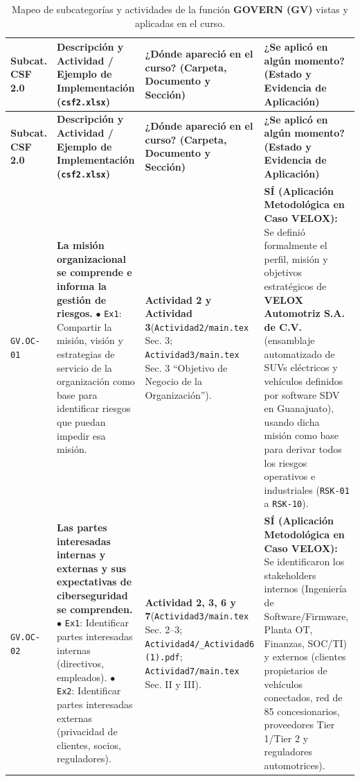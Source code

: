 \documentclass[letterpaper,11pt]{article}
\begin{document}
\begingroup
\scriptsize
\setlength{\tabcolsep}{3.5pt}
\renewcommand{\arraystretch}{1.24}
\begin{longtable}{|C{1.5cm}|L{5.3cm}|L{4.3cm}|L{5.8cm}|}
\caption{Mapeo de subcategorías y actividades de la función \textbf{GOVERN (GV)} vistas y aplicadas en el curso.}
\label{tab:mapeo-gv} \\
\hline
{}
\textbf{Subcat. CSF 2.0} & \textbf{Descripción y Actividad / Ejemplo de Implementación (\texttt{csf2.xlsx})} & \textbf{¿Dónde apareció en el curso? (Carpeta, Documento y Sección)} & \textbf{¿Se aplicó en algún momento? (Estado y Evidencia de Aplicación)} \\
\hline
\endfirsthead
\hline
{}
\textbf{Subcat. CSF 2.0} & \textbf{Descripción y Actividad / Ejemplo de Implementación (\texttt{csf2.xlsx})} & \textbf{¿Dónde apareció en el curso? (Carpeta, Documento y Sección)} & \textbf{¿Se aplicó en algún momento? (Estado y Evidencia de Aplicación)} \\
\hline
\endhead
\hline
\endfoot

\texttt{GV.OC-01} &
\textbf{La misión organizacional se comprende e informa la gestión de riesgos.}\newline
$\bullet$ \texttt{Ex1}: Compartir la misión, visión y estrategias de servicio de la organización como base para identificar riesgos que puedan impedir esa misión. &
\textbf{Actividad 2 y Actividad 3}\newline (\texttt{Actividad2/main.tex} Sec. 3; \texttt{Actividad3/main.tex} Sec. 3 ``Objetivo de Negocio de la Organización''). &
\textbf{SÍ (Aplicación Metodológica en Caso VELOX):}\newline
Se definió formalmente el perfil, misión y objetivos estratégicos de \textbf{VELOX Automotriz S.A. de C.V.} (ensamblaje automatizado de SUVs eléctricos y vehículos definidos por software SDV en Guanajuato), usando dicha misión como base para derivar todos los riesgos operativos e industriales (\texttt{RSK-01} a \texttt{RSK-10}). \\
\hline

\texttt{GV.OC-02} &
\textbf{Las partes interesadas internas y externas y sus expectativas de ciberseguridad se comprenden.}\newline
$\bullet$ \texttt{Ex1}: Identificar partes interesadas internas (directivos, empleados).\newline
$\bullet$ \texttt{Ex2}: Identificar partes interesadas externas (privacidad de clientes, socios, reguladores). &
\textbf{Actividad 2, 3, 6 y 7}\newline (\texttt{Actividad3/main.tex} Sec. 2--3; \texttt{Actividad4/\_Actividad6 (1).pdf}; \texttt{Actividad7/main.tex} Sec. II y III). &
\textbf{SÍ (Aplicación Metodológica en Caso VELOX):}\newline
Se identificaron los stakeholders internos (Ingeniería de Software/Firmware, Planta OT, Finanzas, SOC/TI) y externos (clientes propietarios de vehículos conectados, red de 85 concesionarios, proveedores Tier 1/Tier 2 y reguladores automotrices). \\
\hline


\end{longtable}
\end{document}

